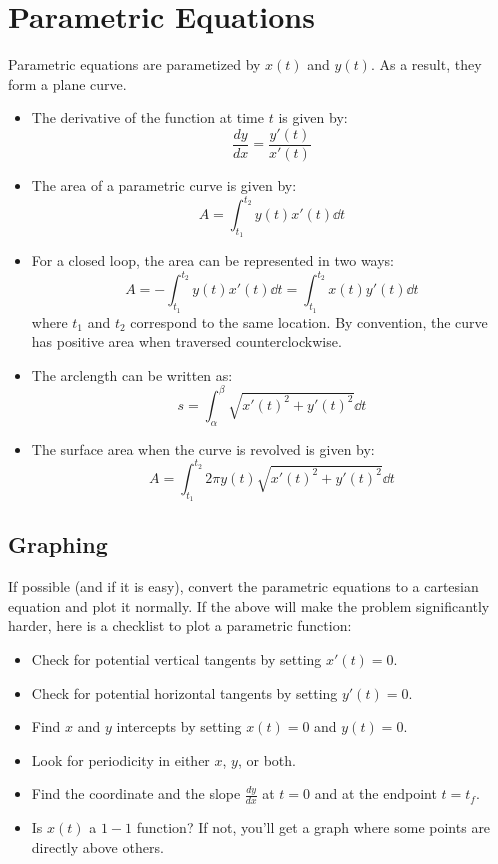 \documentclass{article}
\begin{document}
    \section{Parametric Equations}
    Parametric equations are parametized by $x(t)$ and $y(t)$. As a result, they form a plane curve.
    \begin{itemize}
        \item The derivative of the function at time $t$ is given by:
        \begin{equation}
            \frac{dy}{dx} = \frac{y'(t)}{x'(t)}
        \end{equation}
        \item The area of a parametric curve is given by:
        \begin{equation}
            A = \int_{t_1}^{t_2} y(t)x'(t) \dd{t}
        \end{equation}
        \item For a closed loop, the area can be represented in two ways:
        \begin{equation}
            A = -\int_{t_1}^{t_2} y(t)x'(t) \dd{t} = \int_{t_1}^{t_2} x(t)y'(t) \dd{t}
        \end{equation}
        where $t_1$ and $t_2$ correspond to the same location. By convention, the curve has positive area when traversed counterclockwise.
        \item The arclength can be written as:
        \begin{equation}
            s = \int_\alpha^\beta \sqrt{x'(t)^2+y'(t)^2}\dd{t}
        \end{equation}
        \item The surface area when the curve is revolved is given by:
        \begin{equation}
            A = \int_{t_1}^{t_2} 2\pi y(t)\sqrt{x'(t)^2+y'(t)^2} \dd{t}
        \end{equation}
    \end{itemize}
    \subsection{Graphing}
    If possible (and if it is easy), convert the parametric equations to a cartesian equation and plot it normally. If the above will make the problem significantly harder, here is a checklist to plot a parametric function:
    \begin{itemize}
        \item Check for potential vertical tangents by setting $x'(t)=0$.
        \item Check for potential horizontal tangents by setting $y'(t)=0$.
        \item Find $x$ and $y$ intercepts by setting $x(t)=0$ and $y(t)=0$.
        \item Look for periodicity in either $x$, $y$, or both.
        \item Find the coordinate and the slope $\frac{dy}{dx}$ at $t=0$ and at the endpoint $t=t_f$.
        \item Is $x(t)$ a $1-1$ function? If not, you'll get a graph where some points are directly above others.
    \end{itemize}
\end{document}
